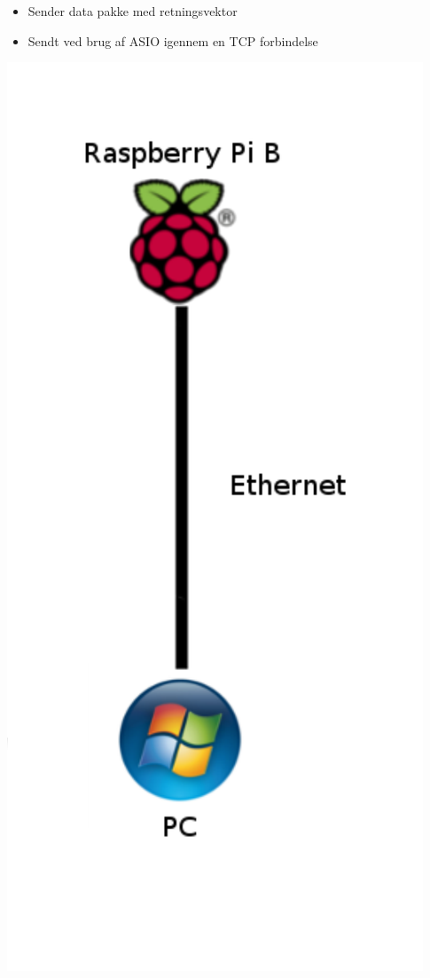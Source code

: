 \begin{frame}[fragile]{\insertsection}{\insertsubsection}
\begin{itemize}
	\item Sender data pakke med retningsvektor
	\item Sendt ved brug af ASIO igennem en TCP forbindelse
\end{itemize}
\includegraphics[height=.8\textheight]{pictures/piwindows.pdf}
\end{frame}

